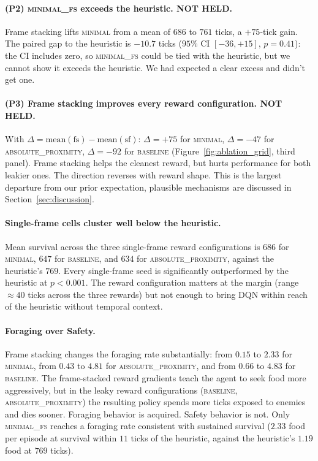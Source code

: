 \documentclass[12pt,a4paper,titlepage]{article}
\begin{document}
\paragraph{(P2) \textsc{minimal\_fs} exceeds the heuristic. NOT HELD.}
Frame stacking lifts \textsc{minimal} from a mean of $686$ to $761$ ticks, a $+75$-tick gain. The paired gap to the heuristic is $-10.7$ ticks ($95\%$ CI $[-36, +15]$, $p = 0.41$): the CI includes zero, so \textsc{minimal\_fs} could be tied with the heuristic, but we cannot show it exceeds the heuristic. We had expected a clear excess and didn't get one.

\paragraph{(P3) Frame stacking improves every reward configuration. NOT HELD.}
With $\Delta = \text{mean}(\text{fs}) - \text{mean}(\text{sf})$: $\Delta = +75$ for \textsc{minimal}, $\Delta = -47$ for \textsc{absolute\_proximity}, $\Delta = -92$ for \textsc{baseline} (Figure~\ref{fig:ablation_grid}, third panel). Frame stacking helps the cleanest reward, but hurts performance for both leakier ones. The direction reverses with reward shape. This is the largest departure from our prior expectation, plausible mechanisms are discussed in Section~\ref{sec:discussion}.

\paragraph{Single-frame cells cluster well below the heuristic.}
Mean survival across the three single-frame reward configurations is $686$ for \textsc{minimal}, $647$ for \textsc{baseline}, and $634$ for \textsc{absolute\_proximity}, against the heuristic's $769$. Every single-frame seed is significantly outperformed by the heuristic at $p < 0.001$. The reward configuration matters at the margin (range $\approx 40$ ticks across the three rewards) but not enough to bring DQN within reach of the heuristic without temporal context.

\paragraph{Foraging over Safety.}
Frame stacking changes the foraging rate substantially: from $0.15$ to $2.33$ for \textsc{minimal}, from $0.43$ to $4.81$ for \textsc{absolute\_proximity}, and from $0.66$ to $4.83$ for \textsc{baseline}. The frame-stacked reward gradients teach the agent to seek food more aggressively, but in the leaky reward configurations (\textsc{baseline}, \textsc{absolute\_proximity}) the resulting policy spends more ticks exposed to enemies and dies sooner. Foraging behavior is acquired. Safety behavior is not. Only \textsc{minimal\_fs} reaches a foraging rate consistent with sustained survival ($2.33$ food per episode at survival within $11$ ticks of the heuristic, against the heuristic's $1.19$ food at $769$ ticks).
\end{document}
